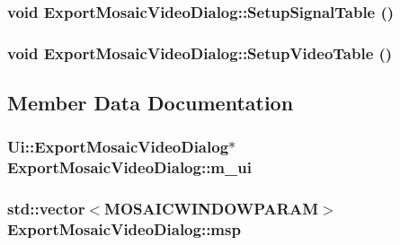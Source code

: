 \hypertarget{class_export_mosaic_video_dialog_4c7a3341701c0fb7cf9f3efc5da48fec}{
\subsubsection[{SetupSignalTable}]{\setlength{\rightskip}{0pt plus 5cm}void ExportMosaicVideoDialog::SetupSignalTable ()}}
\label{class_export_mosaic_video_dialog_4c7a3341701c0fb7cf9f3efc5da48fec}


\hypertarget{class_export_mosaic_video_dialog_984557ee076c770ffe53b37beab0bca6}{
\subsubsection[{SetupVideoTable}]{\setlength{\rightskip}{0pt plus 5cm}void ExportMosaicVideoDialog::SetupVideoTable ()}}
\label{class_export_mosaic_video_dialog_984557ee076c770ffe53b37beab0bca6}




\subsection{Member Data Documentation}
\hypertarget{class_export_mosaic_video_dialog_e7b48fe3d107daf366acf662a784b584}{
\subsubsection[{m\_\-ui}]{\setlength{\rightskip}{0pt plus 5cm}Ui::ExportMosaicVideoDialog$\ast$ {\bf ExportMosaicVideoDialog::m\_\-ui}}}
\label{class_export_mosaic_video_dialog_e7b48fe3d107daf366acf662a784b584}


\hypertarget{class_export_mosaic_video_dialog_ae00e678799aa306deb86070a7c1d390}{
\subsubsection[{msp}]{\setlength{\rightskip}{0pt plus 5cm}std::vector$<${\bf MOSAICWINDOWPARAM}$>$ {\bf ExportMosaicVideoDialog::msp}}}
\label{class_export_mosaic_video_dialog_ae00e678799aa306deb86070a7c1d390}


